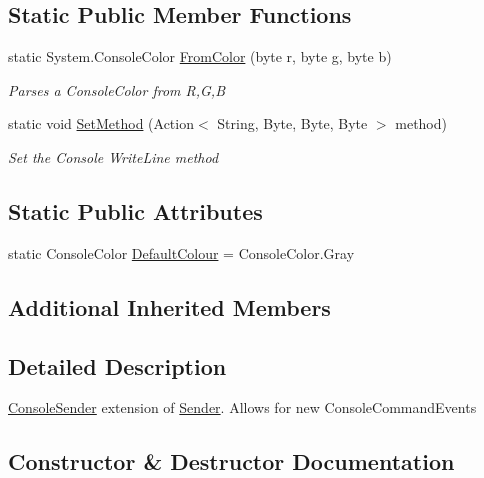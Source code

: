 \subsection*{Static Public Member Functions}
\begin{DoxyCompactItemize}
\item 
static System.\+Console\+Color \hyperlink{classOTA_1_1Command_1_1ConsoleSender_aa0495ec231617554d0341c7b0c53020d}{From\+Color} (byte r, byte g, byte b)
\begin{DoxyCompactList}\small\item\em Parses a Console\+Color from R,G,B \end{DoxyCompactList}\item 
static void \hyperlink{classOTA_1_1Command_1_1ConsoleSender_a8221eb58b3a5f827ba21a5e9c7aaea69}{Set\+Method} (Action$<$ String, Byte, Byte, Byte $>$ method)
\begin{DoxyCompactList}\small\item\em Set the Console Write\+Line method \end{DoxyCompactList}\end{DoxyCompactItemize}
\subsection*{Static Public Attributes}
\begin{DoxyCompactItemize}
\item 
static Console\+Color \hyperlink{classOTA_1_1Command_1_1ConsoleSender_a45c8186e29d86af5d38a0f35774db44a}{Default\+Colour} = Console\+Color.\+Gray
\end{DoxyCompactItemize}
\subsection*{Additional Inherited Members}


\subsection{Detailed Description}
\hyperlink{classOTA_1_1Command_1_1ConsoleSender}{Console\+Sender} extension of \hyperlink{classOTA_1_1Command_1_1Sender}{Sender}. Allows for new Console\+Command\+Events 



\subsection{Constructor \& Destructor Documentation}
\hypertarget{classOTA_1_1Command_1_1ConsoleSender_a9e8a53f8e4474d7ad93e7fdc993baa87}{}
